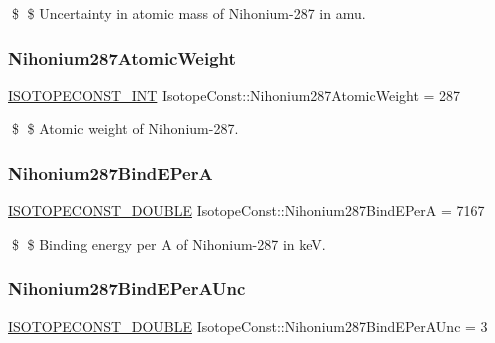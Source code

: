 \$ \$ Uncertainty in atomic mass of Nihonium-\/287 in amu. \mbox{\label{group___isotope_const-_nihonium-_nh287_gab30ffe5f775637aefe967ad05c7610d2}} 
\subsubsection{\texorpdfstring{Nihonium287\+Atomic\+Weight}{Nihonium287AtomicWeight}}
{\footnotesize\ttfamily \mbox{\hyperlink{group___isotope_const-_macros_ga5f18360b3e99483a35c32d789e62621c}{I\+S\+O\+T\+O\+P\+E\+C\+O\+N\+S\+T\+\_\+\+I\+NT}} Isotope\+Const\+::\+Nihonium287\+Atomic\+Weight = 287}

\$ \$ Atomic weight of Nihonium-\/287. \mbox{\label{group___isotope_const-_nihonium-_nh287_gae03b2a595748ece9ca76442c20501a1d}} 
\subsubsection{\texorpdfstring{Nihonium287\+Bind\+E\+PerA}{Nihonium287BindEPerA}}
{\footnotesize\ttfamily \mbox{\hyperlink{group___isotope_const-_macros_ga8f45a7272ce02c0b4c65c44636ed719a}{I\+S\+O\+T\+O\+P\+E\+C\+O\+N\+S\+T\+\_\+\+D\+O\+U\+B\+LE}} Isotope\+Const\+::\+Nihonium287\+Bind\+E\+PerA = 7167}

\$ \$ Binding energy per A of Nihonium-\/287 in keV. \mbox{\label{group___isotope_const-_nihonium-_nh287_ga6df0b347030b0711a2a581d46244b0ed}} 
\subsubsection{\texorpdfstring{Nihonium287\+Bind\+E\+Per\+A\+Unc}{Nihonium287BindEPerAUnc}}
{\footnotesize\ttfamily \mbox{\hyperlink{group___isotope_const-_macros_ga8f45a7272ce02c0b4c65c44636ed719a}{I\+S\+O\+T\+O\+P\+E\+C\+O\+N\+S\+T\+\_\+\+D\+O\+U\+B\+LE}} Isotope\+Const\+::\+Nihonium287\+Bind\+E\+Per\+A\+Unc = 3}

